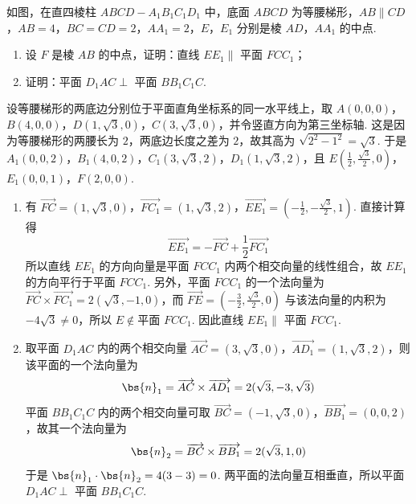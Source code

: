 \begin{problem}
如图，在直四棱柱 \(ABCD - A_{1}B_{1}C_{1}D_{1}\) 中，底面 \(ABCD\) 为等腰梯形，\(AB \parallel CD\)，\(AB = 4\)，\(BC = CD = 2\)，\(AA_{1} = 2\)，\(E\)，\(E_{1}\) 分别是棱 \(AD\)，\(AA_{1}\) 的中点.

\begin{enumerate}
\item 设 \(F\) 是棱 \(AB\) 的中点，证明：直线 \(EE_{1} \parallel\) 平面 \(FCC_{1}\)；
\item 证明：平面 \(D_{1}AC \perp\) 平面 \(BB_{1}C_{1}C\).
\end{enumerate}

\end{problem}

\begin{solution}
设等腰梯形的两底边分别位于平面直角坐标系的同一水平线上，取 \(A(0,0,0)\)，\(B(4,0,0)\)，\(D(1,\sqrt{3},0)\)，\(C(3,\sqrt{3},0)\)，并令竖直方向为第三坐标轴. 这是因为等腰梯形的两腰长为 \(2\)，两底边长度之差为 \(2\)，故其高为 \(\sqrt{2^{2}-1^{2}}=\sqrt{3}\). 于是 \(A_{1}(0,0,2)\)，\(B_{1}(4,0,2)\)，\(C_{1}(3,\sqrt{3},2)\)，\(D_{1}(1,\sqrt{3},2)\)，且 \(E\left(\frac{1}{2},\frac{\sqrt{3}}{2},0\right)\)，\(E_{1}(0,0,1)\)，\(F(2,0,0)\).

\begin{enumerate}
\item 有 \(\overrightarrow{FC}=(1,\sqrt{3},0)\)，\(\overrightarrow{FC_{1}}=(1,\sqrt{3},2)\)，\(\overrightarrow{EE_{1}}=\left(-\frac{1}{2},-\frac{\sqrt{3}}{2},1\right)\). 直接计算得
\[
\overrightarrow{EE_{1}}=-\overrightarrow{FC}+\frac{1}{2}\overrightarrow{FC_{1}}
\]
所以直线 \(EE_{1}\) 的方向向量是平面 \(FCC_{1}\) 内两个相交向量的线性组合，故 \(EE_{1}\) 的方向平行于平面 \(FCC_{1}\). 另外，平面 \(FCC_{1}\) 的一个法向量为 \(\overrightarrow{FC}\times\overrightarrow{FC_{1}}=2(\sqrt{3},-1,0)\)，而 \(\overrightarrow{FE}=\left(-\frac{3}{2},\frac{\sqrt{3}}{2},0\right)\) 与该法向量的内积为 \(-4\sqrt{3}\ne0\)，所以 \(E\notin\text{平面 }FCC_{1}\). 因此直线 \(EE_{1}\parallel\) 平面 \(FCC_{1}\).

\item 取平面 \(D_{1}AC\) 内的两个相交向量 \(\overrightarrow{AC}=(3,\sqrt{3},0)\)，\(\overrightarrow{AD_{1}}=(1,\sqrt{3},2)\)，则该平面的一个法向量为
\[
\bs{n}_{1}=\overrightarrow{AC}\times\overrightarrow{AD_{1}}=2(\sqrt{3},-3,\sqrt{3})
\]
平面 \(BB_{1}C_{1}C\) 内的两个相交向量可取 \(\overrightarrow{BC}=(-1,\sqrt{3},0)\)，\(\overrightarrow{BB_{1}}=(0,0,2)\)，故其一个法向量为
\[
\bs{n}_{2}=\overrightarrow{BC}\times\overrightarrow{BB_{1}}=2(\sqrt{3},1,0)
\]
于是 \(\bs{n}_{1}\cdot\bs{n}_{2}=4(3-3)=0\). 两平面的法向量互相垂直，所以平面 \(D_{1}AC\perp\) 平面 \(BB_{1}C_{1}C\).
\end{enumerate}
\end{solution}

